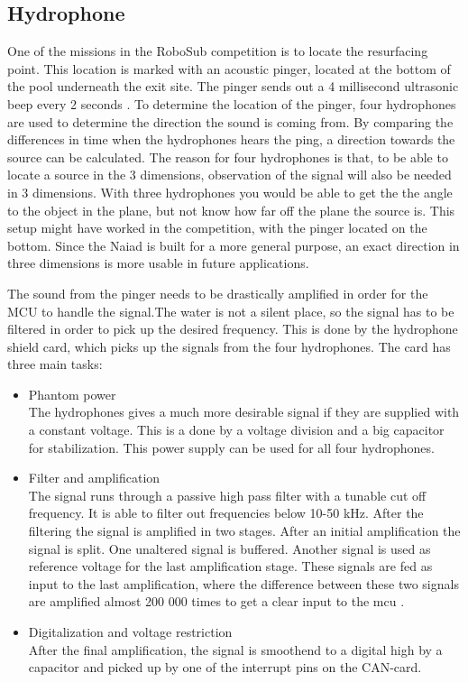 \subsection{Hydrophone} %
\noindent
One of the missions in the RoboSub competition is to locate the resurfacing point. This location is marked with an acoustic pinger, located at the bottom of the pool underneath the exit site. The pinger sends out a 4 millisecond ultrasonic beep every 2 seconds \cite{robosubrules}. To determine the location of the pinger, four hydrophones are used to determine the direction the sound is coming from. By comparing the differences in time when the hydrophones hears the ping, a direction towards the source can be calculated. The reason for four hydrophones is that, to be able to locate a source in the 3 dimensions, observation of the signal will also be needed in 3 dimensions. With three hydrophones you would be able to get the the angle to the object in the plane, but not know how far off the plane the source is. This setup might have worked in the competition, with the pinger located on the bottom. Since the Naiad is built for a more general purpose, an exact direction in three dimensions is more usable in future applications.

The sound from the pinger needs to be drastically amplified in order for the MCU to handle the signal.The water is not a silent place, so the signal has to be filtered in order to pick up the desired frequency. This is done by the hydrophone shield card, which picks up the signals from the four hydrophones. The card has three main tasks:
\begin{itemize}
\item{Phantom power}
\\The hydrophones gives a much more desirable signal if they are supplied with a constant voltage. This is a done by a voltage division and a big capacitor for stabilization. This power supply can be used for all four hydrophones.
\item{Filter and amplification}
\\The signal runs through a passive high pass filter with a tunable cut off frequency. It is able to filter out frequencies below 10-50 kHz. After the filtering the signal is amplified in two stages. After an  initial amplification the signal is split. One unaltered signal is buffered. Another signal is used as reference voltage for the last amplification stage. These signals are fed as input to the last amplification, where the difference between these two signals are amplified almost 200 000 times to get a clear input to the mcu .
\item{Digitalization and voltage restriction} \\
After the final amplification, the signal is smoothend to a digital high by a capacitor and picked up by one of the interrupt pins on the CAN-card.

\end{itemize}

